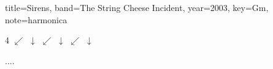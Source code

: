 \documentclass{skrul-leadsheet}
\begin{document}
\begin{song}[transpose-capo=true]{title={Sirens}, band={The String Cheese Incident}, year={2003}, key={Gm}, note={harmonica}}
\begin{chorus}
\end{chorus}

\begin{interlude}
4 $\swarrow$ $\downarrow$ $\swarrow$ $\downarrow$ $\swarrow$ $\downarrow$ \\
\end{interlude}

\begin{solo}
....	
\end{solo}

\begin{chorus}
\end{chorus}

\end{song}
\end{document}
